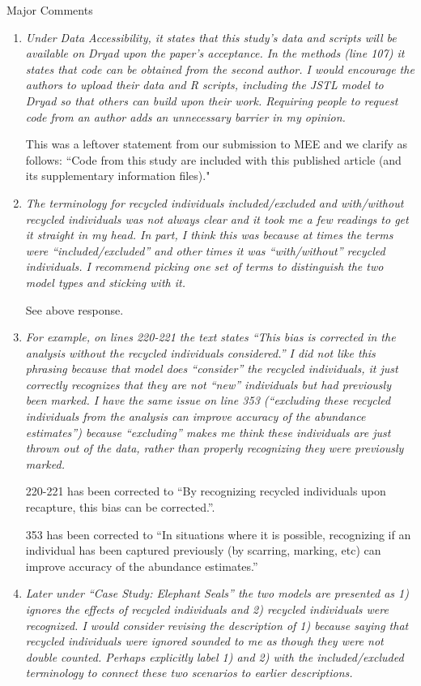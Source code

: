 \documentclass[12pt]{article}
\begin{document}
\bigskip

\noindent Major Comments
\begin{enumerate}
\item  {\it Under Data Accessibility, it states that this study’s data and scripts will be available on Dryad upon the paper’s acceptance. In the methods (line 107) it states that code can be obtained from the second author. I would encourage the authors to upload their data and R scripts, including the JSTL model to Dryad so that others can build upon their work. Requiring people to request code from an author adds an unnecessary barrier in my opinion.}

This was a leftover statement from our submission to MEE and we clarify as follows:
``Code from this study are included with this published article (and its supplementary information files)."

\item  {\it The terminology for recycled individuals included/excluded and with/without recycled individuals was not always clear and it took me a few readings to get it straight in my head. In part, I think this was because at times the terms were “included/excluded” and other times it was “with/without” recycled individuals. I recommend picking one set of terms to distinguish the two model types and sticking with it.}

See above response.

\item {\it For example, on lines 220-221 the text states “This bias is corrected in the analysis without the recycled individuals considered.” I did not like this phrasing because that model does “consider” the recycled individuals, it just correctly recognizes that they are not “new” individuals but had previously been marked. I have the same issue on line 353 (“excluding these recycled individuals from the analysis can improve accuracy of the abundance estimates”) because “excluding” makes me think these individuals are just thrown out of the data, rather than properly recognizing they were previously marked.}

220-221 has been corrected to ``By recognizing recycled individuals upon recapture, this bias can be corrected.''. 

353 has been corrected to ``In
situations where it is possible, recognizing if an individual has been
captured previously (by scarring, marking, etc) can improve accuracy of the
abundance estimates.''

\item {\it Later under “Case Study: Elephant Seals” the two models are presented as 1) ignores the effects of recycled individuals and 2) recycled individuals were recognized. I would consider revising the description of 1) because saying that recycled individuals were ignored sounded to me as though they were not double counted. Perhaps explicitly label 1) and 2) with the included/excluded terminology to connect these two scenarios to earlier descriptions.}


\end{enumerate}
\end{document}
